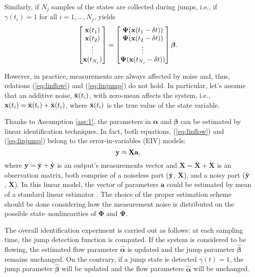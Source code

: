 Similarly, if $N_j$ samples of the states are collected during jumps, i.e., if $\gamma(t_i)=1$ for all $i = 1,\dots,N_j$, yields
%
\begin{equation}\label{eq:linjump}
	\begin{bmatrix}{\mathbf{x}}(t_1)\\\mathbf{x}(t_2)\\\vdots\\{\mathbf{x}}(t_{N_j})\end{bmatrix}=
	\begin{bmatrix}\bm{\Psi}(\mathbf{x}(t_1-\delta t))\\\bm{\Psi}(\mathbf{x}(t_2-\delta t))\\\vdots\\\bm{\Psi}(\mathbf{x}(t_{N_j}-\delta t))\end{bmatrix}\bm{\beta}.
\end{equation}
%

However, in practice, measurements are always affected by noise and, thus, relations (\ref{eq:linflow}) and (\ref{eq:linjump}) do not hold.
In particular, let's assume that an additive noise, $\tilde{\mathbf{x}}(t_i)$, with zero-mean affects the system, i.e., $\mathbf{x}(t_i)=\bar{\mathbf{x}}(t_i)+\tilde{\mathbf{x}}(t_i)$, where $\bar{\mathbf{x}}(t_i)$ is the true value of the state variable.

Thanks to Assumption \ref{ass:1}, the parameters in $\bm{\alpha}$ and $\bm{\beta}$ can be estimated by linear identification techniques. In fact, both equations,  (\ref{eq:linflow}) and (\ref{eq:linjump}) belong to the error-in-variables (EIV) models:
%
\begin{equation}
	\mathbf{y}\approx \mathbf{Xa},
\end{equation}
%
where $\mathbf{y} = \bar{\mathbf{y}}+\tilde{\mathbf{y}}$ is an output's measurements vector and $\mathbf{X} = \bar{\mathbf{X}}+\tilde{\mathbf{X}}$ is an observation matrix, both comprise of a noiseless part ($\bar{\mathbf{y}}$, $\bar{\mathbf{X}}$), and  a noisy part ($\tilde{\mathbf{y}}$, $\tilde{\mathbf{X}}$).
%
{%
In this linear model, the vector of parameters $\mathbf{a}$ could be estimated by mean of a standard linear estimator \cite{ljung1987system}. The choice of the proper estimation scheme should be done considering how the measurement noise is distributed on the possible state--nonlinearities of $\bm{\Phi}$ and $\bm{\Psi}$.
}%

The overall identification experiment is carried out as follows: at each sampling time, the jump detection function is computed. If the system is considered to be flowing, the estimated flow parameter $\hat{\bm{\alpha}}$ is updated and the jump parameter $\hat{\bm{\beta}}$ remains unchanged. On the contrary, if a jump state is detected  $\gamma(t)=1$, the jump parameter $\hat{\bm{\beta}}$ will be updated and the flow parameters $\hat{\bm{\alpha}}$ will be unchanged.

